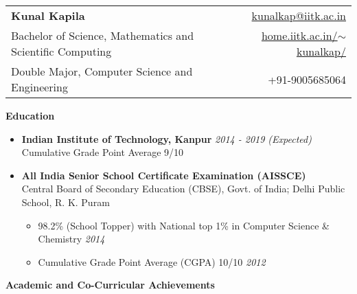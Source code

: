 \documentclass[letterpaper,11pt]{article}
\begin{document}
{\selectfont
\begin{tabular*}{7.5in}{l@{\extracolsep{\fill}}r}
    \textbf{\Large Kunal Kapila} & \href{mailto:kunalkap@iitk.ac.in}{kunalkap@iitk.ac.in}\\
    Bachelor of Science, Mathematics and Scientific Computing & \href{http://home.iitk.ac.in/~kunalkap/}{home.iitk.ac.in/$\sim$kunalkap/}\\
    Double Major, Computer Science and Engineering & +91-9005685064\\
    \hline
\end{tabular*}
\vspace{5pt}

\Large{\textbf{Education}}
\small
\begin{itemize}
    \item
        \textbf{Indian Institute of Technology, Kanpur} \hfill \textit{2014 - 2019 (Expected)}\\
        Cumulative Grade Point Average 9/10\\
    \item
        \textbf{All India Senior School Certificate Examination (AISSCE)}\\
        Central Board of Secondary Education (CBSE), Govt. of India; Delhi Public School, R. K. Puram\\
        \begin{itemize}
            \item 98.2\% (School Topper) with National top 1\% in Computer Science \& Chemistry \hfill \textit{2014}\\
            \item Cumulative Grade Point Average (CGPA) 10/10 \hfill\textit{2012}\\
        \end{itemize}
\end{itemize}

\Large{\textbf{Academic and Co-Curricular Achievements}}
\small

}
\end{document}

